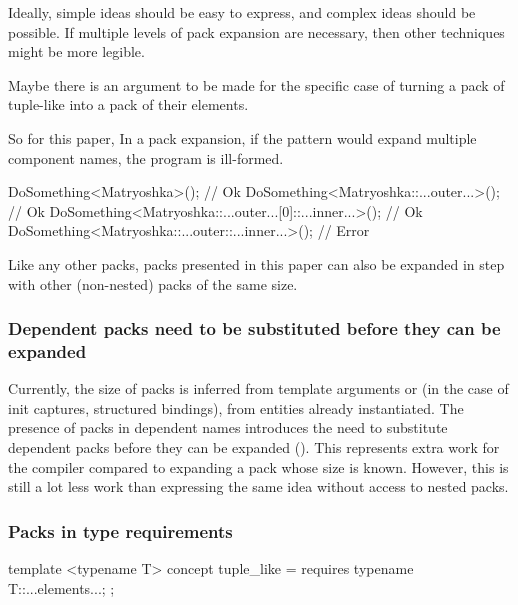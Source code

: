 \documentclass{wg21}
\begin{document}
Ideally, simple ideas should be easy to express, and complex ideas should be possible.
If multiple levels of pack expansion are necessary, then other techniques might be more legible.

Maybe there is an argument to be made for the specific case of turning a pack of tuple-like
into a pack of their elements.

So for this paper, In a pack expansion, if the pattern would expand multiple component names, the program is ill-formed.

\begin{colorblock}
DoSomething<Matryoshka>(); // Ok
DoSomething<Matryoshka::...outer...>(); // Ok
DoSomething<Matryoshka::...outer...[0]::...inner...>(); // Ok
DoSomething<Matryoshka::...outer::...inner...>(); // Error
\end{colorblock}

Like any other packs, packs presented in this paper can also be expanded in step with other (non-nested) packs of the same size.

\subsubsection{Dependent packs need to be substituted before they can be expanded}


Currently, the size of packs is inferred from template arguments or (in the case of init captures, structured bindings),
from entities already instantiated.
The presence of packs in dependent names introduces the need to substitute dependent packs before they can be expanded ().
This represents extra work for the compiler compared to expanding a pack whose size is known.
However, this is still a lot less work than expressing the same idea without access to nested packs.

\subsubsection{Packs in type requirements}

\begin{colorblock}

template <typename T>
concept tuple_like = requires {
    typename T::...elements...;
};

\end{colorblock}
\end{document}
